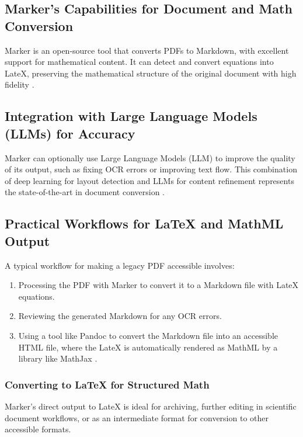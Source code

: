 \subsection{Marker's Capabilities for Document and Math Conversion}\label{ch11:ssec:marker-capabilities}
Marker is an open-source tool that converts PDFs to Markdown, with excellent support for mathematical content. It can detect and convert equations into \gls{LateX}, preserving the mathematical structure of the original document with high fidelity \supercite{Marker}.

\subsection{Integration with Large Language Models (LLMs) for Accuracy}\label{ch11:ssec:marker-llm}
Marker can optionally use Large Language Models (\gls{LLM}) to improve the quality of its output, such as fixing \gls{OCR} errors or improving text flow. This combination of deep learning for layout detection and \gls{LLM}s for content refinement represents the state-of-the-art in document conversion \supercite{MarkerDocs}.

\subsection{Practical Workflows for LaTeX and MathML Output}\label{ch11:ssec:marker-workflows}
A typical workflow for making a legacy PDF accessible involves:
\begin{enumerate}
	\item Processing the PDF with Marker to convert it to a Markdown file with \gls{LateX} equations.
	\item Reviewing the generated Markdown for any \gls{OCR} errors.
	\item Using a tool like Pandoc to convert the Markdown file into an accessible HTML file, where the \gls{LateX} is automatically rendered as \gls{MathML} by a library like MathJax \supercite{PandocDocs}.
\end{enumerate}

\subsubsection{Converting to LaTeX for Structured Math}\label{ch11:sssec:marker-latex}
Marker's direct output to \gls{LateX} is ideal for archiving, further editing in scientific document workflows, or as an intermediate format for conversion to other accessible formats.

